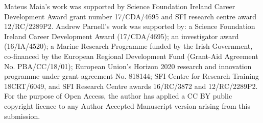 \documentclass[aoas,preprint]{imsart}
\theoremstyle{plain}
\theoremstyle{definition}
\theoremstyle{remark}
\begin{document}
\begin{funding}
\small
    Mateus Maia's work was supported by Science Foundation Ireland Career Development Award grant number 17/CDA/4695 and SFI research centre award 12/RC/2289P2. Andrew Parnell's work was supported by: a Science Foundation Ireland Career Development Award (17/CDA/4695); an investigator award (16/IA/4520); a Marine Research Programme funded by the Irish Government, co-financed by the European Regional Development Fund (Grant-Aid Agreement No. PBA/CC/18/01); European Union's Horizon 2020 research and innovation programme under grant agreement No. 818144; SFI Centre for Research Training 18CRT/6049, and SFI Research Centre awards 16/RC/3872 and 12/RC/2289P2. For the purpose of Open Access, the author has applied a CC BY public copyright licence to any Author Accepted Manuscript version arising from this submission.
\end{funding}

\begin{supplement}
\end{supplement}
\begin{supplement}
\end{supplement}
\begin{supplement}
\end{supplement}
\begin{supplement}
\end{supplement}
\begin{supplement}
\end{supplement}

{}


\end{document}
